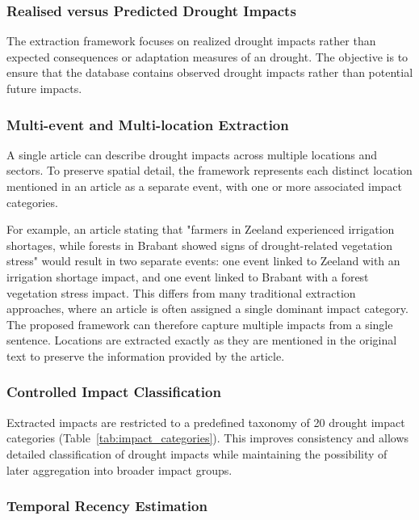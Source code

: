 \subsubsection{Realised versus Predicted Drought Impacts}

The extraction framework focuses on realized drought impacts rather than expected consequences or adaptation measures of an drought. The objective is to ensure that the database contains observed drought impacts rather than potential future impacts.


\subsubsection{Multi-event and Multi-location Extraction}

A single article can describe drought impacts across multiple locations and sectors. To preserve spatial detail, the framework represents each distinct location mentioned in an article as a separate event, with one or more associated impact categories.

For example, an article stating that "farmers in Zeeland experienced irrigation shortages, while forests in Brabant showed signs of drought-related vegetation stress" would result in two separate events: one event linked to Zeeland with an irrigation shortage impact, and one event linked to Brabant with a forest vegetation stress impact. This differs from many traditional extraction approaches, where an article is often assigned a single dominant impact category. The proposed framework can therefore capture multiple impacts from a single sentence. Locations are extracted exactly as they are mentioned in the original text to preserve the information provided by the article.


\subsubsection{Controlled Impact Classification}

Extracted impacts are restricted to a predefined taxonomy of 20 drought impact categories (Table~\ref{tab:impact_categories}). This improves consistency and allows detailed classification of drought impacts while maintaining the possibility of later aggregation into broader impact groups.


\subsubsection{Temporal Recency Estimation}

